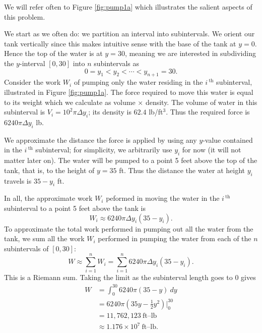 {We will refer often to Figure \ref{fig:pump1a} which illustrates the salient aspects of this problem.

We start as we often do: we partition an interval into subintervals. We orient our tank vertically since this makes intuitive sense with the base of the tank at $y=0$. Hence the top of the water is at $y=30$, meaning we are interested in subdividing the $y$-interval $[0,30]$ into $n$ subintervals as 
$$0 = y_1 < y_2 < \cdots < y_{n+1} = 30.$$
Consider the work $W_i$ of pumping only the water residing in the $i\,^\text{th}$ subinterval, illustrated in Figure \ref{fig:pump1a}. The force required to move this water is equal to its weight which we calculate as volume $\times $ density. The volume of water in this subinterval is 
$V_i = 10^2\pi \Delta y_i$; its density is $62.4$ lb/ft$^3$. Thus the required force is $6240\pi\Delta y_i$ lb.

We approximate the distance the force is applied by using any $y$-value contained in the $i\,^\text{th}$ subinterval; for simplicity, we arbitrarily use $y_i$ for now (it will not matter later on). The water will be pumped to a point 5 feet above the top of the tank, that is, to the height of $y=35$ ft. Thus the distance the water at height $y_i$ travels is $35-y_i$ ft. 

In all, the approximate work $W_i$ peformed in moving the water in the $i\,^\text{th}$ subinterval to a point 5 feet above the tank is 
$$W_i \approx 6240\pi\Delta y_i(35-y_i).$$
To approximate the total work performed in pumping out all the water from the tank, we sum all the work $W_i$ performed in pumping the water from each of the $n$ subintervals of $[0,30]$:
$$W \approx \sum_{i=1}^n W_i = \sum_{i=1}^n 6240\pi\Delta y_i(35-y_i).$$
This is a Riemann sum. Taking the limit as the subinterval length goes to 0 gives 
\begin{align*}
W 	&=	\int_0^{30} 6240\pi(35-y)\ dy \\
		&=  6240\pi\left(35y-\frac{1}{2}y^2\right)\Big|_0^{30} \\
		&= 	11,762,123 \ \text{ft--lb}\\
		&\approx  1.176 \times 10^7 \ \text{ft--lb}.
\end{align*}
\baselineskip
}\\
\clearpage


